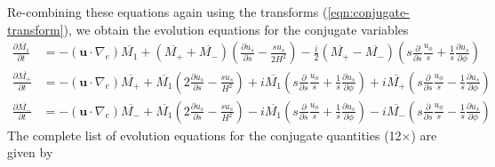 Re-combining these equations again using the transforms (\ref{eqn:conjugate-transform}), we obtain the evolution equations for the conjugate variables
\[\begin{aligned}
    \frac{\partial \overline{M_1}}{\partial t} &= - \left(\mathbf{u}\cdot \nabla_e \right) \overline{M_1} + \left(\overline{M_+} + \overline{M_-}\right) \left(\frac{\partial u_s}{\partial s} - \frac{su_s}{2H^2}\right) - \frac{i}{2} \left(\overline{M_+} - \overline{M_-}\right) \left(s \frac{\partial}{\partial s}\frac{u_\phi}{s} + \frac{1}{s}\frac{\partial u_s}{\partial \phi}\right) \\
    \frac{\partial \overline{M_+}}{\partial t} &= - \left(\mathbf{u}\cdot \nabla_e \right) \overline{M_+} + \overline{M_1} \left(2\frac{\partial u_s}{\partial s} - \frac{su_s}{H^2}\right) + i\overline{M_1} \left(s \frac{\partial}{\partial s}\frac{u_\phi}{s} + \frac{1}{s}\frac{\partial u_s}{\partial \phi}\right) + i \overline{M_+} \left(s \frac{\partial}{\partial s}\frac{u_\phi}{s} - \frac{1}{s}\frac{\partial u_s}{\partial \phi}\right) \\ 
    \frac{\partial \overline{M_-}}{\partial t} &= - \left(\mathbf{u}\cdot \nabla_e \right) \overline{M_-} + \overline{M_1} \left(2\frac{\partial u_s}{\partial s} - \frac{su_s}{H^2}\right) - i\overline{M_1} \left(s \frac{\partial}{\partial s}\frac{u_\phi}{s} + \frac{1}{s}\frac{\partial u_s}{\partial \phi}\right) - i \overline{M_-} \left(s \frac{\partial}{\partial s}\frac{u_\phi}{s} - \frac{1}{s}\frac{\partial u_s}{\partial \phi}\right)
\end{aligned}\]
The complete list of evolution equations for the conjugate quantities (12$\times$) are given by
